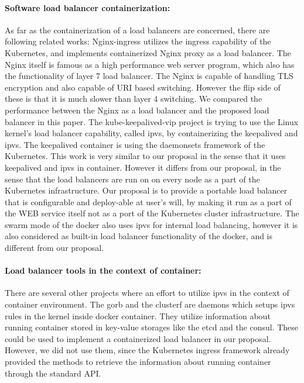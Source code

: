\paragraph{\bf Software load balancer containerization:}
As far as the containerization of a load balancers are concerned, there are following related works:
Nginx-ingress\cite{Pleshakov2016,NginxInc2016} utilizes the ingress\cite{K8sIngress2017} capability of the Kubernetes, 
and implements containerized Nginx proxy as a load balancer. The Nginx itself is famous as a high performance web server program,
which also has the functionality of layer 7 load balancer. The Nginx is capable of handling TLS encryption and also capable of  
URI based switching. However the flip side of these is that it is much slower than layer 4 switching.
We compared the performance between the Nginx as a load balancer and the proposed load balancer in this paper.
The kube-keepalived-vip\cite{Prashanth2016} project is trying to use the Linux kernel's load balancer capability, 
called ipvs\cite{Zhang2000}, by containerizing the keepalived\cite{ACassen2016} and ipvs. 
The keepalived container is using the daemonsets\cite{K8sDaemonsets2017} framework of the Kubernetes. 
This work is very similar to our proposal in the sense that it uses keepalived and ipvs in container.
However it differs from our proposal, in the sense that the load balancers are run on on every node 
as a part of the Kubernetes infrastructure.
Our proposal is to provide a portable load balancer that is configurable and deploy-able at user's will, 
by making it run as a part of the WEB service itself not as a port of the Kubernetes cluster infrastructure.  
The swarm mode of the docker\cite{DockerCoreEngineering2016,DockerInc2017} also uses ipvs for internal load balancing,
however it is also considered as built-in load balancer functionality of the docker, 
and is different from our proposal.

\paragraph{\bf Load balancer tools in the context of container:}
There are several other projects where an effort to utilize ipvs in the context of container environment.
The gorb\cite{Sibiryov2015} and the clusterf\cite{Aaltodoc:http://urn.fi/URN:NBN:fi:aalto-201611025433} are daemons 
which setups ipvs rules in the kernel inside docker container. 
They utilize information about running container stored in key-value storages
like the etcd\cite{CoreOSEtcd} and the consul\cite{HashiCorpConsul}. 
These could be used to implement a containerized load balancer in our proposal.
However, we did not use them, since the Kubernetes ingress framework already provided the methods to retrieve 
the information about running container through the standard API.

